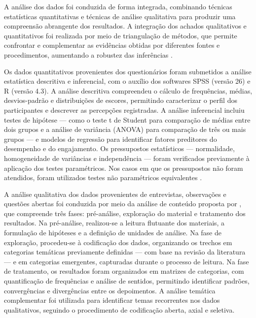 A análise dos dados foi conduzida de forma integrada, combinando técnicas estatísticas quantitativas e técnicas de análise qualitativa para produzir uma compreensão abrangente dos resultados. A integração dos achados qualitativos e quantitativos foi realizada por meio de triangulação de métodos, que permite confrontar e complementar as evidências obtidas por diferentes fontes e procedimentos, aumentando a robustez das inferências \cite{CRESWELL2018}.

Os dados quantitativos provenientes dos questionários foram submetidos a análise estatística descritiva e inferencial, com o auxílio dos softwares SPSS (versão 26) e R (versão 4.3). A análise descritiva compreendeu o cálculo de frequências, médias, desvios-padrão e distribuições de escores, permitindo caracterizar o perfil dos participantes e descrever as percepções registradas. A análise inferencial incluiu testes de hipótese — como o teste t de Student para comparação de médias entre dois grupos e a análise de variância (ANOVA) para comparação de três ou mais grupos — e modelos de regressão para identificar fatores preditores do desempenho e do engajamento. Os pressupostos estatísticos — normalidade, homogeneidade de variâncias e independência — foram verificados previamente à aplicação dos testes paramétricos. Nos casos em que os pressupostos não foram atendidos, foram utilizados testes não paramétricos equivalentes \cite{BARDIN2016}.

A análise qualitativa dos dados provenientes de entrevistas, observações e questões abertas foi conduzida por meio da análise de conteúdo proposta por \cite{BARDIN2016}, que compreende três fases: pré-análise, exploração do material e tratamento dos resultados. Na pré-análise, realizou-se a leitura flutuante dos materiais, a formulação de hipóteses e a definição de unidades de análise. Na fase de exploração, procedeu-se à codificação dos dados, organizando os trechos em categorias temáticas previamente definidas — com base na revisão da literatura — e em categorias emergentes, capturadas durante o processo de leitura. Na fase de tratamento, os resultados foram organizados em matrizes de categorias, com quantificação de frequências e análise de sentidos, permitindo identificar padrões, convergências e divergências entre os depoimentos. A análise temática complementar foi utilizada para identificar temas recorrentes nos dados qualitativos, seguindo o procedimento de codificação aberta, axial e seletiva.

